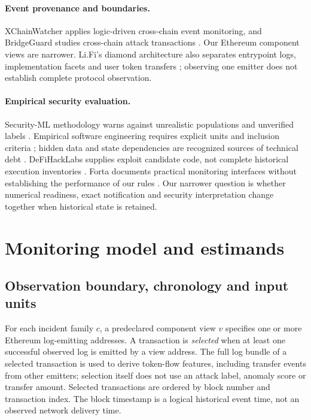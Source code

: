 \documentclass[preprint,12pt,authoryear]{elsarticle}
\begin{document}
\paragraph{Event provenance and boundaries.} XChainWatcher applies logic-driven cross-chain event monitoring, and BridgeGuard studies cross-chain attack transactions \citep{Augusto2025XChainWatcher,Wu2025BridgeGuard}. Our Ethereum component views are narrower. Li.Fi's diamond architecture also separates entrypoint logs, implementation facets and user token transfers \citep{Mudge2020ERC2535,BlockSec2022LiFi}; observing one emitter does not establish complete protocol observation.

\paragraph{Empirical security evaluation.} Security-ML methodology warns against unrealistic populations and unverified labels \citep{Sommer2010ClosedWorld,Arp2022Dons}. Empirical software engineering requires explicit units and inclusion criteria \citep{Kitchenham2004Evidence,Wohlin2012Experimentation}; hidden data and state dependencies are recognized sources of technical debt \citep{Sculley2015Debt}. DeFiHackLabs supplies exploit candidate code, not complete historical execution inventories \citep{DeFiHackLabs2026}. Forta documents practical monitoring interfaces without establishing the performance of our rules \citep{FortaDocs}. Our narrower question is whether numerical readiness, exact notification and security interpretation change together when historical state is retained.

\section{Monitoring model and estimands}\label{sec:model}

\subsection{Observation boundary, chronology and input units}
For each incident family $c$, a predeclared component view $v$ specifies one or more Ethereum log-emitting addresses. A transaction is \emph{selected} when at least one successful observed log is emitted by a view address. The full log bundle of a selected transaction is used to derive token-flow features, including transfer events from other emitters; selection itself does not use an attack label, anomaly score or transfer amount. Selected transactions are ordered by block number and transaction index. The block timestamp is a logical historical event time, not an observed network delivery time.
\end{document}
